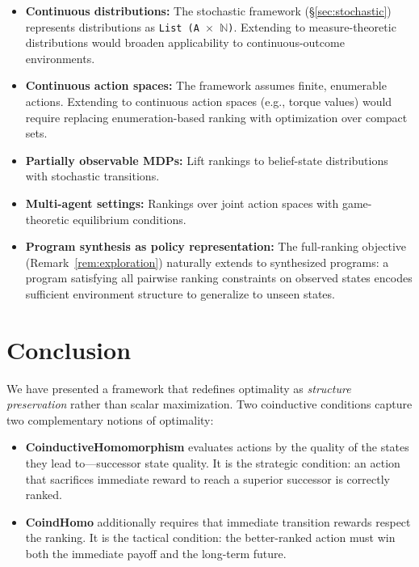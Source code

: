 \documentclass[9pt,a4paper]{article}
\theoremstyle{plain}
\theoremstyle{definition}
\theoremstyle{remark}
\begin{document}
\begin{itemize}
\item \textbf{Continuous distributions:} The stochastic framework (\S\ref{sec:stochastic}) represents distributions as \texttt{List (A $\times$ $\mathbb{N}$)}.  Extending to measure-theoretic distributions would broaden applicability to continuous-outcome environments.
\item \textbf{Continuous action spaces:} The framework assumes finite, enumerable actions.  Extending to continuous action spaces (e.g., torque values) would require replacing enumeration-based ranking with optimization over compact sets.
\item \textbf{Partially observable MDPs:} Lift rankings to belief-state distributions with stochastic transitions.
\item \textbf{Multi-agent settings:} Rankings over joint action spaces with game-theoretic equilibrium conditions.
\item \textbf{Program synthesis as policy representation:} The full-ranking objective (Remark~\ref{rem:exploration}) naturally extends to synthesized programs: a program satisfying all pairwise ranking constraints on observed states encodes sufficient environment structure to generalize to unseen states.
\end{itemize}

\section{Conclusion}

We have presented a framework that redefines optimality as \emph{structure preservation} rather than scalar maximization.  Two coinductive conditions capture two complementary notions of optimality:

\begin{itemize}
\item \textbf{CoinductiveHomomorphism} evaluates actions by the quality of the states they lead to---successor state quality.  It is the strategic condition: an action that sacrifices immediate reward to reach a superior successor is correctly ranked.

\item \textbf{CoindHomo} additionally requires that immediate transition rewards respect the ranking.  It is the tactical condition: the better-ranked action must win both the immediate payoff and the long-term future.
\end{itemize}
\end{document}
